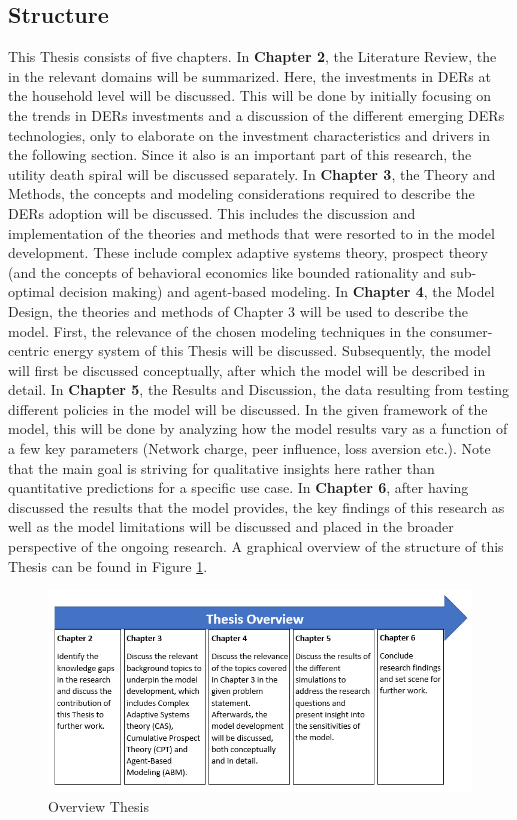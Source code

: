 \subsection{Structure}
This Thesis consists of five chapters. In \textbf{Chapter 2}, the Literature Review, the in the relevant domains will be summarized. Here, the investments in DERs at the household level will be discussed. This will be done by initially focusing on the trends in DERs investments and a discussion of the different emerging DERs technologies, only to elaborate on the investment characteristics and drivers in the following section. Since it also is an important part of this research, the utility death spiral will be discussed separately. In \textbf{Chapter 3}, the Theory and Methods, the concepts and modeling considerations required to describe the DERs adoption will be discussed. This includes the discussion and implementation of the theories and methods that were resorted to in the model development. These include complex adaptive systems theory, prospect theory (and the concepts of behavioral economics like bounded rationality and sub-optimal decision making) and agent-based modeling. In \textbf{Chapter 4}, the Model Design, the theories and methods of Chapter 3 will be used to describe the model. First, the relevance of the chosen modeling techniques in the consumer-centric energy system of this Thesis will be discussed. Subsequently, the model will first be discussed conceptually, after which the model will be described in detail. In \textbf{Chapter 5}, the Results and Discussion, the data resulting from testing different policies in the model will be discussed. In the given framework of the model, this will be done by analyzing how the model results vary as a function of a few key parameters (Network charge, peer influence, loss aversion etc.). Note that the main goal is striving for qualitative insights here rather than quantitative predictions for a specific use case. In \textbf{Chapter 6}, after having discussed the results that the model provides, the key findings of this research as well as the model limitations will be discussed and placed in the broader perspective of the ongoing research.
\newline \newline \noindent
A graphical overview of the structure of this Thesis can be found in Figure \ref{Figure:struct}.
\newline 
\begin{figure}[h!]
\centering
\includegraphics[width=\textwidth]{overview.PNG}
\caption[Overview Thesis]{Overview Thesis}
\label{Figure:struct}
\end{figure}
\newline 
\noindent